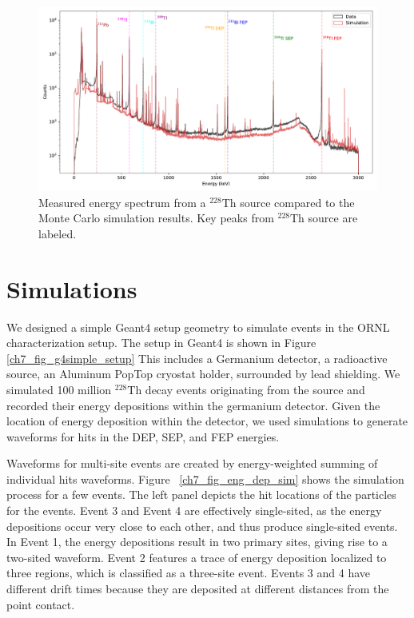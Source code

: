 \begin{figure}%
\centering
    \includegraphics[width=0.99\linewidth,trim={0pc 0pc 0pc 0pc},clip]{ch7/figs/energy_spectrum_comparison.pdf}
    \caption{Measured energy spectrum from a $^{228}$Th source compared to the Monte Carlo simulation results. Key peaks from $^{228}$Th source are labeled.}
   \label{ch7_fig_eng_spec_comp}
\end{figure}

\section{Simulations}
We designed a simple Geant4 setup geometry to simulate events in the ORNL characterization setup. The setup in Geant4 is shown in Figure \ref{ch7_fig_g4simple_setup} This includes a Germanium detector, a radioactive source, an Aluminum PopTop cryostat holder, surrounded by lead shielding. We simulated 100 million $^{228}$Th decay events originating from the source and recorded their energy depositions within the germanium detector. Given the location of energy deposition within the detector, we used {\siggen} simulations to generate waveforms for hits in the DEP, SEP, and FEP energies.

Waveforms for multi-site events are created by energy-weighted summing of individual hits waveforms. Figure ~\ref{ch7_fig_eng_dep_sim} shows the simulation process for a few events. The left panel depicts the hit locations of the particles for the events. Event 3 and Event 4 are effectively single-sited, as the energy depositions occur very close to each other, and thus produce single-sited events. In Event 1, the energy depositions result in two primary sites, giving rise to a two-sited waveform. Event 2 features a trace of energy deposition localized to three regions, which is classified as a three-site event. Events 3 and 4 have different drift times because they are deposited at different distances from the point contact.

